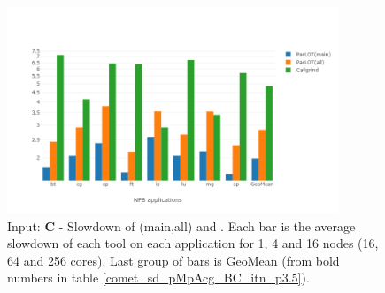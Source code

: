 \begin{figure}[!t]
\centering
\includegraphics[width=3.9in]{figs.comet/comet_chartAvg_sd_C_p3_5.png}
\caption{ Input: \textbf{C} - Slowdown of \parlot(main,all) and \callgrind. Each bar is the average slowdown of each tool on each application for 1, 4 and 16 nodes (16, 64 and 256 cores). Last group of bars is GeoMean (from bold numbers in table \ref{comet_sd_pMpAcg_BC_itn_p3.5}). 
}
\label{comet_chartAvg_sd_C_p3_5}
\end{figure}




